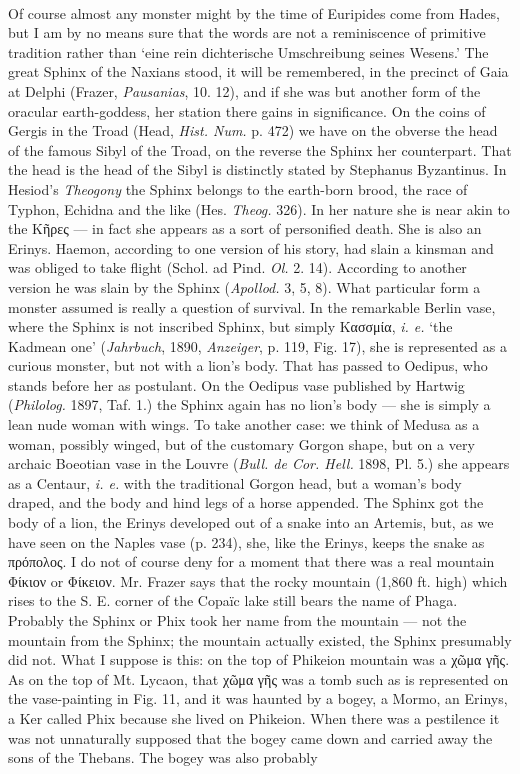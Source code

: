 \documentclass[a4paper, 11pt, oneside, polutonikogreek, english]{article}
\begin{document}
\paragraph{}
Of course almost any monster might by the time of Euripides come from Hades, but I am by no means sure that the words are not a reminiscence of primitive tradition rather than `eine rein dichterische Umschreibung seines Wesens.' The great Sphinx of the Naxians stood, it will be remembered, in the precinct of Gaia at Delphi (Frazer, \emph{Pausanias}, 10. 12), and if she was but another form of the oracular earth-goddess, her station there gains in significance. On the coins of Gergis in the Troad (Head, \emph{Hist. Num.} p. 472) we have on the obverse the head of the famous Sibyl of the Troad, on the reverse the Sphinx her counterpart. That the head is the head of the Sibyl is distinctly stated by Stephanus Byzantinus. In Hesiod's \emph{Theogony} the Sphinx belongs to the earth-born brood, the race of Typhon, Echidna and the like (Hes. \emph{Theog.} 326). In her nature she is near akin to the Κῆρες --- in fact she appears as a sort of personified death. She is also an Erinys. Haemon, according to one version of his story, had slain a kinsman and was obliged to take flight (Schol. ad Pind. \emph{Ol.} 2. 14). According to another version he was slain by the Sphinx (\emph{Apollod.} 3, 5, 8). What particular form a monster assumed is really a question of survival. In the remarkable Berlin vase, where the Sphinx is not inscribed Sphinx, but simply Κασσμία, \emph{i. e.} `the Kadmean one' (\emph{Jahrbuch}, 1890, \emph{Anzeiger}, p. 119, Fig. 17), she is represented as a curious monster, but not with a lion's body. That has passed to Oedipus, who stands before her as postulant. On the Oedipus vase published by Hartwig (\emph{Philolog.} 1897, Taf. 1.) the Sphinx again has no lion's body --- she is simply a lean nude woman with wings. To take another case: we think of Medusa as a woman, possibly winged, but of the customary Gorgon shape, but on a very archaic Boeotian vase in the Louvre (\emph{Bull. de Cor. Hell.} 1898, Pl. 5.) she appears as a Centaur, \emph{i. e.} with the traditional Gorgon head, but a woman's body draped, and the body and hind legs of a horse appended. The Sphinx got the body of a lion, the Erinys developed out of a snake into an Artemis, but, as we have seen on the Naples vase (p. 234), she, like the Erinys, keeps the snake as πρόπολος. I do not of course deny for a moment that there was a real mountain Φίκιον or Φίκειον. Mr. Frazer says that the rocky mountain (1,860 ft. high) which rises to the S. E. corner of the Copaïc lake still bears the name of Phaga. Probably the Sphinx or Phix took her name from the mountain --- not the mountain from the Sphinx; the mountain actually existed, the Sphinx presumably did not. What I suppose is this: on the top of Phikeion mountain was a χῶμα γῆς. As on the top of Mt. Lycaon, that χῶμα γῆς was a tomb such as is represented on the vase-painting in Fig. 11, and it was haunted by a bogey, a Mormo, an Erinys, a Ker called Phix because she lived on Phikeion. When there was a pestilence it was not unnaturally supposed that the bogey came down and carried away the sons of the Thebans. The bogey was also probably 
\end{document}
